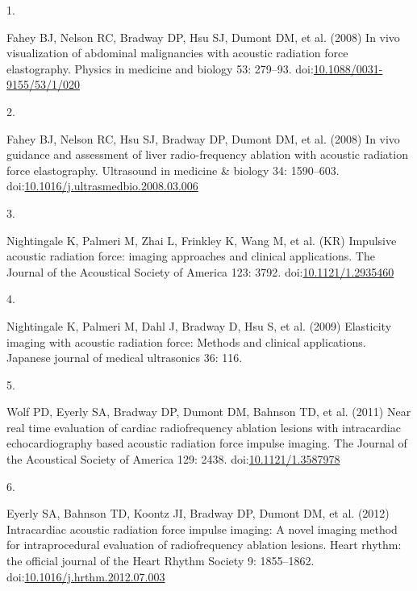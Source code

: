 \documentclass[
]{article}
\newlength{\cslhangindent}
\newlength{\csllabelwidth}
\newlength{\cslentryspacingunit} %
\newenvironment{CSLReferences}[2] %
 {%
  \setlength{\parindent}{0pt}
  \ifodd #1
  \let\oldpar\par
  \def\par{\hangindent=\cslhangindent\oldpar}
  \fi
  \setlength{\parskip}{#2\cslentryspacingunit}
 }%
 {}
\newcommand{\CSLLeftMargin}[1]{\parbox[t]{\csllabelwidth}{#1}}
\newcommand{\CSLRightInline}[1]{\parbox[t]{\linewidth - \csllabelwidth}{#1}\break}
\begin{document}
\hypertarget{refs}{}
\begin{CSLReferences}{0}{0}
\leavevmode{}%
\CSLLeftMargin{1. }
\CSLRightInline{Fahey BJ, Nelson RC, Bradway DP, Hsu SJ, Dumont DM, et
al. (2008) {In vivo visualization of abdominal malignancies with
acoustic radiation force elastography}. Physics in medicine and biology
53: 279--93.
doi:\href{https://doi.org/10.1088/0031-9155/53/1/020}{10.1088/0031-9155/53/1/020}}

\leavevmode{}%
\CSLLeftMargin{2. }
\CSLRightInline{Fahey BJ, Nelson RC, Hsu SJ, Bradway DP, Dumont DM, et
al. (2008) {In vivo guidance and assessment of liver radio-frequency
ablation with acoustic radiation force elastography}. Ultrasound in
medicine \& biology 34: 1590--603.
doi:\href{https://doi.org/10.1016/j.ultrasmedbio.2008.03.006}{10.1016/j.ultrasmedbio.2008.03.006}}

\leavevmode{}%
\CSLLeftMargin{3. }
\CSLRightInline{Nightingale K, Palmeri M, Zhai L, Frinkley K, Wang M, et
al. (KR) {Impulsive acoustic radiation force: imaging approaches and
clinical applications}. The Journal of the Acoustical Society of America
123: 3792.
doi:\href{https://doi.org/10.1121/1.2935460}{10.1121/1.2935460}}

\leavevmode{}%
\CSLLeftMargin{4. }
\CSLRightInline{Nightingale K, Palmeri M, Dahl J, Bradway D, Hsu S, et
al. (2009) Elasticity imaging with acoustic radiation force: Methods and
clinical applications. Japanese journal of medical ultrasonics 36: 116.}

\leavevmode{}%
\CSLLeftMargin{5. }
\CSLRightInline{Wolf PD, Eyerly SA, Bradway DP, Dumont DM, Bahnson TD,
et al. (2011) {Near real time evaluation of cardiac radiofrequency
ablation lesions with intracardiac echocardiography based acoustic
radiation force impulse imaging}. The Journal of the Acoustical Society
of America 129: 2438.
doi:\href{https://doi.org/10.1121/1.3587978}{10.1121/1.3587978}}

\leavevmode{}%
\CSLLeftMargin{6. }
\CSLRightInline{Eyerly SA, Bahnson TD, Koontz JI, Bradway DP, Dumont DM,
et al. (2012) {Intracardiac acoustic radiation force impulse imaging: A
novel imaging method for intraprocedural evaluation of radiofrequency
ablation lesions}. Heart rhythm: the official journal of the Heart
Rhythm Society 9: 1855--1862.
doi:\href{https://doi.org/10.1016/j.hrthm.2012.07.003}{10.1016/j.hrthm.2012.07.003}}


\end{CSLReferences}
\end{document}
